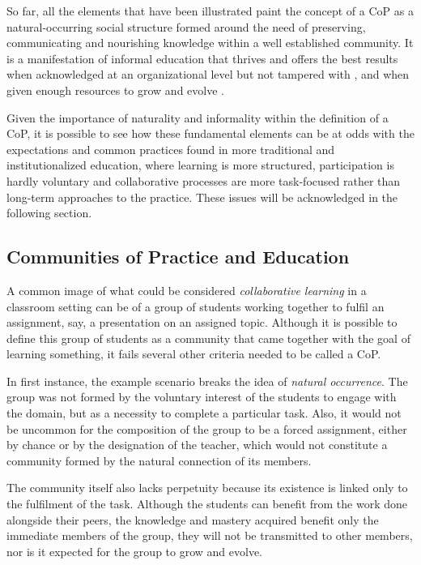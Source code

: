 So far, all the elements that have been illustrated paint the concept of a \ac{CoP} as a natural-occurring social structure formed around the need of preserving, communicating and nourishing knowledge within a well established community.
It is a manifestation of informal education that thrives and offers the best results when acknowledged at an organizational level but not tampered with \parencite{brown_1991}, and when given enough resources to grow and evolve \parencite{klein_2008}.

Given the importance of naturality and informality within the definition of a \ac{CoP}, it is possible to see how these fundamental elements can be at odds with the expectations and common practices found in more traditional and
institutionalized education, where learning is more structured, participation is hardly voluntary and collaborative processes are more task-focused rather than long-term approaches to the practice. These issues will be acknowledged in the
following section.

\subsection{Communities of Practice and Education \label{sec:2-1-3}}

A common image of what could be considered \emph{collaborative learning} in a classroom setting can be of a group of students working together to fulfil an assignment, say, a presentation on an assigned topic. Although it is possible to define this
group of students as a community that came together with the goal of learning something, it fails several other criteria needed to be called a \ac{CoP}.

In first instance, the example scenario breaks the idea of \emph{natural occurrence}. The group was not formed by the voluntary interest of the students to engage with the domain, but as a necessity to complete a particular task. Also, it would not
be uncommon for the composition of the group to be a forced assignment, either by chance or by the designation of the teacher, which would not constitute a community formed by the natural connection of its members.

The community itself also lacks perpetuity because its existence is linked only to the fulfilment of the task. Although the students can benefit from the work done alongside their peers, the knowledge and mastery acquired benefit only the immediate
members of the group, they will not be transmitted to other members, nor is it expected for the group to grow and evolve.

